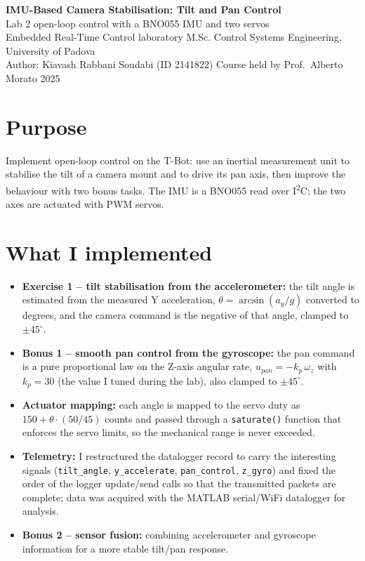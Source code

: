 \documentclass[10pt,a4paper]{article}
\begin{document}
\begin{center}
{\Large\bfseries IMU-Based Camera Stabilisation: Tilt and Pan Control}\\[2pt]
{\large Lab 2 \textendash{} open-loop control with a BNO055 IMU and two servos}\\[4pt]
{\small Embedded Real-Time Control laboratory \textendash{} M.Sc. Control Systems Engineering, University of Padova}\\
{\small Author: Kiavash Rabbani Soudabi (ID 2141822) \textendash{} Course held by Prof.\ Alberto Morato \textendash{} 2025}
\end{center}

\section*{Purpose}
Implement open-loop control on the T-Bot: use an inertial measurement unit to stabilise the tilt of a camera mount
and to drive its pan axis, then improve the behaviour with two bonus tasks. The IMU is a BNO055 read over
I\textsuperscript{2}C; the two axes are actuated with PWM servos.

\section*{What I implemented}
\begin{itemize}
  \item \textbf{Exercise 1 -- tilt stabilisation from the accelerometer:} the tilt angle is estimated from the
        measured Y acceleration, $\theta=\arcsin(a_y/g)$ converted to degrees, and the camera command is the negative
        of that angle, clamped to $\pm45^\circ$.
  \item \textbf{Bonus 1 -- smooth pan control from the gyroscope:} the pan command is a pure proportional law on the
        Z-axis angular rate, $u_{pan}=-k_p\,\omega_z$ with $k_p=30$ (the value I tuned during the lab), also clamped
        to $\pm45^\circ$.
  \item \textbf{Actuator mapping:} each angle is mapped to the servo duty as $150+\theta\cdot(50/45)$ counts and
        passed through a \texttt{saturate()} function that enforces the servo limits, so the mechanical range is
        never exceeded.
  \item \textbf{Telemetry:} I restructured the datalogger record to carry the interesting signals
        (\texttt{tilt\_angle}, \texttt{y\_accelerate}, \texttt{pan\_control}, \texttt{z\_gyro}) and fixed the order of
        the logger update/send calls so that the transmitted packets are complete; data was acquired with the MATLAB
        serial/WiFi datalogger for analysis.
  \item \textbf{Bonus 2 -- sensor fusion:} combining accelerometer and gyroscope information for a more stable
        tilt/pan response.
\end{itemize}
\end{document}
